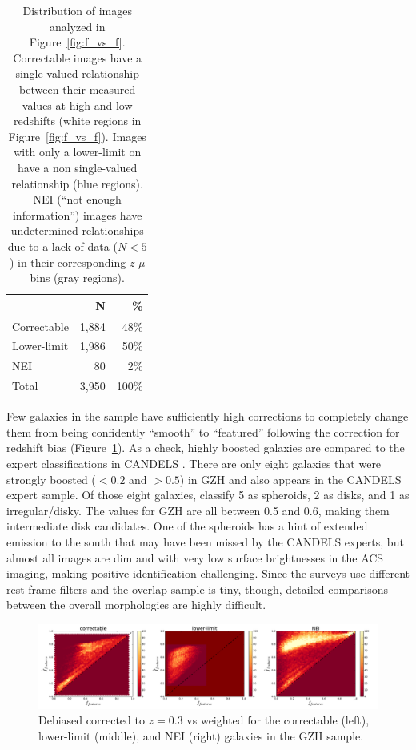 \documentclass[twocolumn]{aastex6}
\begin{document}
\begin{table}
\center
\caption{Distribution of \ferengi{} images analyzed in Figure~\ref{fig:f_vs_f}.
Correctable images have a single-valued relationship between their measured
\ffeatures{} values at high and low redshifts (white regions in
Figure~\ref{fig:f_vs_f}). Images with only a lower-limit on \ffeatures{} have a
non single-valued relationship (blue regions). NEI (``not enough information'')
images have undetermined relationships due to a lack of data ($N<5$) in their
corresponding $z$-$\mu$ bins (gray regions).\label{tbl:ferengi_corrections}}
\begin{tabular}{lrr}
\hline \hline
				                   & N       & \% \\
\hline 
Correctable                        & 1,884   & 48\% \\
Lower-limit                        & 1,986   & 50\% \\
NEI                                & 80      &  2\%\\
Total                              & 3,950   & 100\% \\
\hline \hline
\end{tabular}
\end{table}

Few galaxies in the sample have sufficiently high corrections to completely
change them from being confidently ``smooth'' to ``featured'' following the
correction for redshift bias (Figure~\ref{fig:debiased_corrections}). As a
check, highly boosted galaxies are compared to the expert classifications in
CANDELS \citep{kar15}.  There are only eight galaxies that were strongly
boosted (\ffeatures$<0.2$ and \fbest$>0.5$) in GZH and also appears in the
CANDELS expert sample. Of those eight galaxies, \citet{kar15} classify 5 as
spheroids, 2 as disks, and 1 as irregular/disky. The \fbest{} values for GZH
are all between 0.5 and 0.6, making them intermediate disk candidates. One of
the spheroids has a hint of extended emission to the south that may have been
missed by the CANDELS experts, but almost all images are dim and with very low
surface brightnesses in the ACS imaging, making positive identification
challenging. Since the surveys use different rest-frame filters and the overlap
sample is tiny, though, detailed comparisons between the overall morphologies
are highly difficult.

\begin{figure}
\center
\includegraphics[width=\textwidth]{figures/debiased_corrections.pdf}
\caption{Debiased \ffeatures{} corrected to $z=0.3$ vs weighted \ffeatures{}
for the correctable (left), lower-limit (middle), and NEI (right) galaxies in
    the GZH sample.}
\label{fig:debiased_corrections}
\end{figure}
\end{document}

